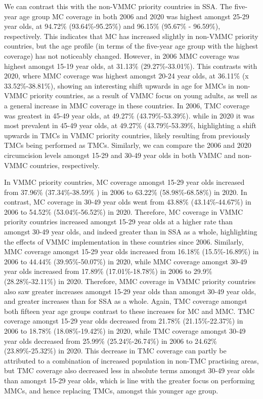 \documentclass{article}
\begin{document}
We can contrast this with the non-VMMC priority countries in SSA. The five-year age group MC coverage in
both 2006 and 2020 was highest amongst 25-29 year olds, at 94.72\% (93.64\%-95.25\%) and 96.15\% (95.67\%
- 96.59\%), respectively. This indicates that MC has increased slightly in non-VMMC priority countries,
but the age profile (in terms of the five-year age group with the highest coverage) has not noticeably changed.
However, in 2006 MMC coverage was highest amongst 15-19 year olds, at 31.13\% (29.27\%-33.01\%). This
contrasts with 2020, where MMC coverage was highest amongst 20-24 year olds, at 36.11\% (x 33.52\%-38.81\%), showing an interesting shift upwards in age for MMCs in non-VMMC priority countries, as a result
of VMMC focus on young adults, as well as a general increase in MMC coverage in these countries. 
In 2006, TMC coverage was greatest in 45-49 year olds, at 49.27\% (43.79\%-53.39\%). while in 2020 it was most
prevalent in 45-49 year olds, at 49.27\% (43.79\%-53.39\%, highlighting a shift upwards in TMCs in VMMC
priority countries, likely resulting from previously TMCs being performed as TMCs.
Similarly, we can compare the 2006 and 2020 circumcision levels amongst 15-29 and 30-49 year olds in both
VMMC and non-VMMC countries, respectively.

In VMMC priority countries, MC coverage amongst 15-29 year olds increased from 37.96\% (37.34\%-38.59\%
) in 2006 to 63.22\% (58.98\%-68.58\%) in 2020. In contrast, MC coverage in 30-49 year olds went from
43.88\% (43.14\%-44.67\%) in 2006 to 54.52\% (53.04\%-56.52\%) in 2020. Therefore, MC coverage in VMMC
priority countries increased amongst 15-29 year olds at a higher rate than amongst 30-49 year olds, and
indeed greater than in SSA as a whole, highlighting the effects of VMMC implementation in these countries
since 2006. Similarly, MMC coverage amongst 15-29 year olds increased from 16.18\% (15.5\%-16.89\%) in
2006 to 44.44\% (39.95\%-50.07\%) in 2020, while MMC coverage amongst 30-49 year olds increased from
17.89\% (17.01\%-18.78\%) in 2006 to 29.9\% (28.28\%-32.11\%) in 2020. Therefore, MMC coverage in
VMMC priority countries also saw greater increases amongst 15-29 year olds than amongst 30-49 year olds,
and greater increases than for SSA as a whole. Again, TMC coverage amongst both fifteen year age groups
contrast to these increases for MC and MMC. TMC coverage amongst 15-29 year olds decreased from 21.78\%
(21.15\%-22.37\%) in 2006 to 18.78\% (18.08\%-19.42\%) in 2020, while TMC coverage amongst 30-49 year
olds decreased from 25.99\% (25.24\%-26.74\%) in 2006 to 24.62\% (23.89\%-25.32\%) in 2020. This decrease
in TMC coverage can partly be attributed to a combination of increased population in non-TMC practising
areas, but TMC coverage also decreased less in absolute terms amongst 30-49 year olds than amongst 15-29
year olds, which is line with the greater focus on performing MMCs, and hence replacing TMCs, amongst
this younger age group.
\end{document}
